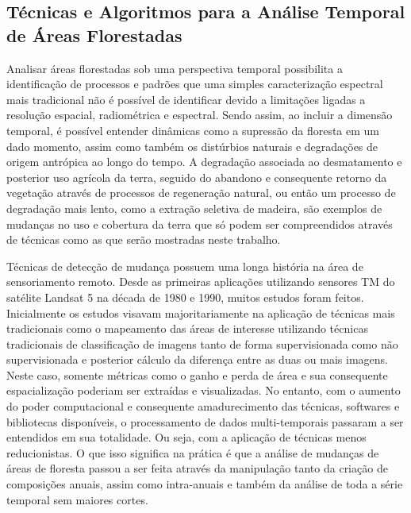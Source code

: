 \documentclass[12pt,a4paper]{article}
\begin{document}
\subsection{Técnicas e Algoritmos para a Análise Temporal de Áreas Florestadas}
Analisar áreas florestadas sob uma perspectiva temporal possibilita a identificação de processos e padrões que uma simples caracterização espectral mais tradicional não é possível de identificar devido a limitações ligadas a resolução espacial, radiométrica e espectral. Sendo assim, ao incluir a dimensão temporal, é possível entender dinâmicas como a supressão da floresta em um dado momento, assim como também os distúrbios naturais e degradações de origem antrópica ao longo do tempo.
A degradação associada ao desmatamento e posterior uso agrícola da terra, seguido do abandono e consequente retorno da vegetação através de processos de regeneração natural, ou então um processo de degradação mais lento, como a extração seletiva de madeira, são exemplos de mudanças no uso e cobertura da terra que só podem ser compreendidos através de técnicas como as que serão mostradas neste trabalho. 

Técnicas de detecção de mudança possuem uma longa história na área de sensoriamento remoto. Desde as primeiras aplicações utilizando sensores TM do satélite Landsat 5 na década de 1980 e 1990, muitos estudos foram feitos. Inicialmente os estudos visavam majoritariamente na aplicação de técnicas mais tradicionais como o mapeamento das áreas de interesse utilizando técnicas tradicionais de classificação de imagens tanto de forma supervisionada como não supervisionada e posterior cálculo da diferença entre as duas ou mais imagens. Neste caso, somente métricas como o ganho e perda de área e sua consequente espacialização poderiam ser extraídas e visualizadas. No entanto, com o aumento do poder computacional e consequente amadurecimento das técnicas, softwares e bibliotecas disponíveis, o processamento de dados multi-temporais passaram a ser entendidos em sua totalidade. Ou seja, com a aplicação de técnicas menos reducionistas. O que isso significa na prática é que a análise de mudanças de áreas de floresta passou a ser feita através da manipulação tanto da criação de composições anuais, assim como intra-anuais e também da análise de toda a série temporal sem maiores cortes.
\end{document}
